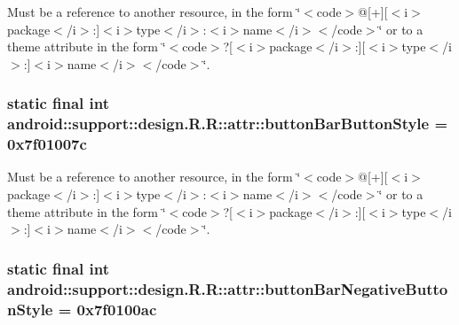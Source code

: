 Must be a reference to another resource, in the form \char`\"{}$<$code$>$@\mbox{[}+\mbox{]}\mbox{[}$<$i$>$package$<$/i$>$:\mbox{]}$<$i$>$type$<$/i$>$:$<$i$>$name$<$/i$>$$<$/code$>$\char`\"{} or to a theme attribute in the form \char`\"{}$<$code$>$?\mbox{[}$<$i$>$package$<$/i$>$:\mbox{]}\mbox{[}$<$i$>$type$<$/i$>$:\mbox{]}$<$i$>$name$<$/i$>$$<$/code$>$\char`\"{}. \hypertarget{classandroid_1_1support_1_1design_1_1_r_1_1attr_03b5feea6e2e18195a9452e42bd954b0}{
\subsubsection[{buttonBarButtonStyle}]{\setlength{\rightskip}{0pt plus 5cm}static final int android::support::design.R.R::attr::buttonBarButtonStyle = 0x7f01007c}}
\label{classandroid_1_1support_1_1design_1_1_r_1_1attr_03b5feea6e2e18195a9452e42bd954b0}


Must be a reference to another resource, in the form \char`\"{}$<$code$>$@\mbox{[}+\mbox{]}\mbox{[}$<$i$>$package$<$/i$>$:\mbox{]}$<$i$>$type$<$/i$>$:$<$i$>$name$<$/i$>$$<$/code$>$\char`\"{} or to a theme attribute in the form \char`\"{}$<$code$>$?\mbox{[}$<$i$>$package$<$/i$>$:\mbox{]}\mbox{[}$<$i$>$type$<$/i$>$:\mbox{]}$<$i$>$name$<$/i$>$$<$/code$>$\char`\"{}. \hypertarget{classandroid_1_1support_1_1design_1_1_r_1_1attr_73b1ecccc1a80c04abd36faa16403b21}{
\subsubsection[{buttonBarNegativeButtonStyle}]{\setlength{\rightskip}{0pt plus 5cm}static final int android::support::design.R.R::attr::buttonBarNegativeButtonStyle = 0x7f0100ac}}
\label{classandroid_1_1support_1_1design_1_1_r_1_1attr_73b1ecccc1a80c04abd36faa16403b21}


